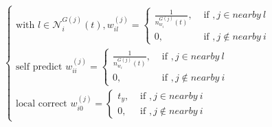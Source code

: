 \documentclass[letterpaper, 10pt, conference]{ieeeconf}  %
\begin{document}
\begin{equation}\label{weight_equal}
\begin{cases}
\text{with } l \in \mathcal{N}_i^{G(j)}(t) ,w_{i l}^{(j)} = \begin{cases}\frac{1}{n_{w_i}^{G(j)}(t)}, & \text { if }, j \in near by ~ l \\
0, & \text { if }, j \notin near by ~i
\end{cases}  \\ 
\text{self predict } w_{i i}^{(j)} = \begin{cases}\frac{1}{n_{w_i}^{G(j)}(t)}, & \text { if }, j \in near by ~ l \\
0, & \text { if }, j \notin near by ~i
\end{cases}  \\
\text{local correct } w_{i 0}^{(j)} = \begin{cases} t_y, & \text { if }, j \in near by ~ i \\
0, & \text { if }, j \notin near by ~i
\end{cases}  
\end{cases}
\end{equation}
\end{document}
